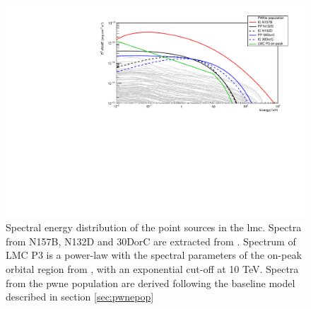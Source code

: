 \documentclass{article}
\begin{document}
     \begin{figure}
        \centering  
        \includegraphics[width=\textwidth]{Pictures/pointsourcesspec.pdf}
        \caption{\label{fig:psourcesspec} Spectral energy distribution of the point sources in the \gls{lmc}. Spectra from N157B, N132D and 30DorC are extracted from \cite{2015HESSTeVLMC}. Spectrum of LMC P3 is a power-law with the spectral parameters of the on-peak orbital region from \cite{2017HESSLMCP3}, with an exponential cut-off at 10 TeV. Spectra from the \gls{pwne} population are derived following the baseline model described in section \ref{sec:pwnepop}}
    \end{figure}
     
\end{document}
